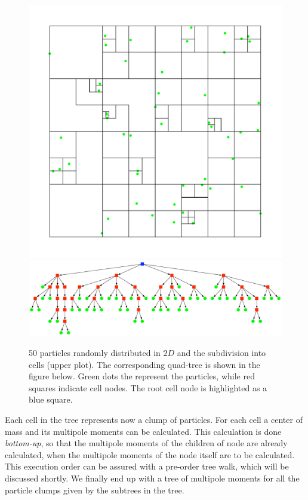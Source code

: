 \begin{figure}[htbp]
\begin{center}
\includegraphics[scale=0.6]{06quadtree50_xy.pdf}
\includegraphics[scale=0.3]{06quadtree50.pdf}
\caption{50 particles randomly distributed in $2D$ and the subdivision into cells (upper plot). The corresponding quad-tree is shown in the figure below. Green dots the represent the particles, while red squares indicate cell nodes. The root cell node is highlighted as a blue square.}
\label{ch02_fig06}
\end{center}
\end{figure}

Each cell in the tree represents now a clump of particles. For each cell a center of mass and its multipole moments can be calculated. This calculation is done \emph{bottom-up}, so that the multipole moments of the children of node are already calculated, when the multipole moments of the node itself are to be calculated. This execution order can be assured with a pre-order tree walk, which will be discussed shortly. We finally end up with a tree of multipole moments for all the particle clumps given by the subtrees in the tree.

